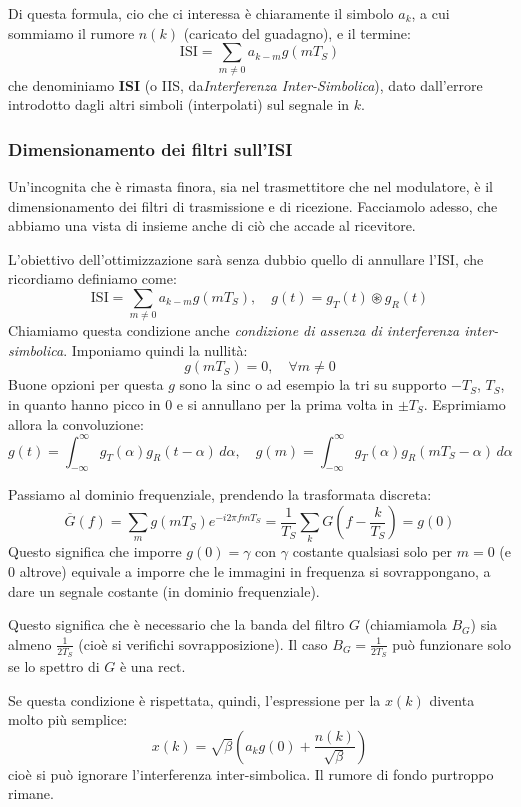 \documentclass[a4paper,11pt]{article}
\begin{document}
Di questa formula, cio che ci interessa è chiaramente il simbolo $a_k$, a cui sommiamo il rumore $n(k)$ (caricato del guadagno), e il termine:
$$
\mathrm{ISI} = \sum_{m \neq 0} a_{k - m} g(m T_S)
$$
che denominiamo \textbf{ISI} (o IIS, da\textit{Interferenza Inter-Simbolica}), dato dall'errore introdotto dagli altri simboli (interpolati) sul segnale in $k$.

\subsubsection{Dimensionamento dei filtri sull'ISI}
Un'incognita che è rimasta finora, sia nel trasmettitore che nel modulatore, è il dimensionamento dei filtri di trasmissione e di ricezione. Facciamolo adesso, che abbiamo una vista di insieme anche di ciò che accade al ricevitore.

L'obiettivo dell'ottimizzazione sarà senza dubbio quello di annullare l'ISI, che ricordiamo definiamo come:
$$
\mathrm{ISI} = \sum_{m \neq 0} a_{k - m} g(m T_S), \quad g(t) = g_T(t) \circledast g_R(t)
$$
Chiamiamo questa condizione anche \textit{condizione di assenza di interferenza inter-simbolica}.
Imponiamo quindi la nullità:
$$
g(m T_S) = 0, \quad \forall m \neq 0
$$
Buone opzioni per questa $g$ sono la $\mathrm{sinc}$ o ad esempio la $\mathrm{tri}$ su supporto $-T_S$, $T_S$, in quanto hanno picco in $0$ e si annullano per la prima volta in $\pm T_S$. Esprimiamo allora la convoluzione:
$$
g(t) = \int_{-\infty}^\infty g_T(\alpha) g_R(t - \alpha) \, d\alpha, \quad g(m) = \int_{-\infty}^\infty g_T(\alpha) g_R(m T_S - \alpha) \, d\alpha 
$$

Passiamo al dominio frequenziale, prendendo la trasformata discreta:
$$
\overline{G} (f) = \sum_m g(m T_S) e^{-i 2 \pi f m T_S} = \frac{1}{T_S} \sum_k G\left( f - \frac{k}{T_S} \right) = g(0)
$$
Questo significa che imporre $g(0) = \gamma$ con $\gamma$ costante qualsiasi solo per $m = 0$ (e $0$ altrove) equivale a imporre che le immagini in frequenza si sovrappongano, a dare un segnale costante (in dominio frequenziale).

Questo significa che è necessario che la banda del filtro $G$ (chiamiamola $B_G$) sia almeno $\frac{1}{2 T_S}$ (cioè si verifichi sovrapposizione). Il caso $B_G = \frac{1}{2 T_S}$ può funzionare solo se lo spettro di $G$ è una $\mathrm{rect}$. 

\par\smallskip

Se questa condizione è rispettata, quindi, l'espressione per la $x(k)$ diventa molto più semplice:
$$
x(k) = \sqrt{\beta} \left( a_k g(0) + \frac{n(k)}{\sqrt{\beta}} \right)
$$
cioè si può ignorare l'interferenza inter-simbolica. Il rumore di fondo purtroppo rimane.
\end{document}
